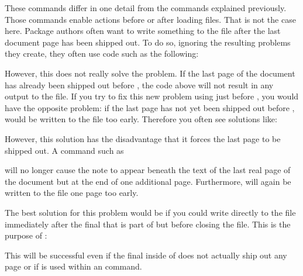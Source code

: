 \begin{Declaration}
\end{Declaration}%
These commands differ in one detail from the commands explained previously.
Those commands enable actions before or after loading files. That is not the
case here. Package authors often want to write something to the 
file after the last document page has been shipped out. To do so, ignoring the
resulting problems they create, they often use code such as the following:
\begin{lstcode}
  \AtEndDocument{%
    \if@filesw
      \write\@auxout{%
        \protect\writethistoaux%
      }%
    \fi
  }
\end{lstcode}
However, this does not really solve the problem. If the last page of the
document has already been shipped out before ,
the code above will not result in any output to the  file. If you
try to fix this new problem using  just before ,
you would have the opposite problem: if the last page has not yet been shipped
out before ,  would be
written to the  file too early. Therefore you often see solutions
like:
\begin{lstcode}
  \AtEndDocument{%
    \if@filesw
      \clearpage
      \immediate\write\@auxout{%
        \protect\writethistoaux%
      }%
    \fi
  }
\end{lstcode}
However, this solution has the disadvantage that it forces the last page to be
shipped out. A command such as
\begin{lstcode}
\end{lstcode}
will no longer cause the note to appear beneath the text of the last real page
of the document but at the end of one additional page. Furthermore,
 will again be written to the  file one page
too early.

The best solution for this problem would be if you could write directly to the
 file immediately after the final 
that is part of  but before closing the
 file. This is the purpose of :
\begin{lstcode}
  \BeforeClosingMainAux{%
    \if@filesw
      \immediate\write\@auxout{%
        \protect\writethistoaux%
      }%
    \fi
  }
\end{lstcode}
This will be successful even if the final 
inside of  does not actually ship out any page
or if  is used within an 
command.

